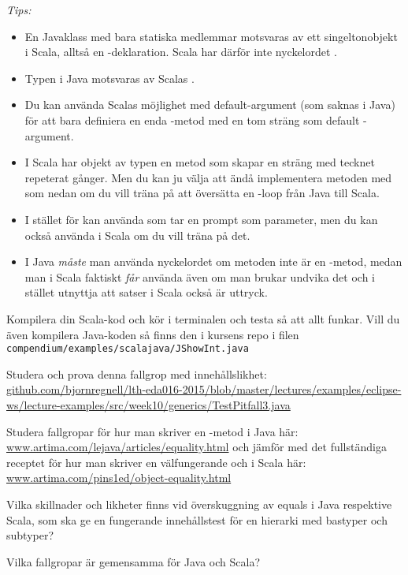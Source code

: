 
\emph{Tips:}
\begin{itemize}[nolistsep, noitemsep]
\item En Javaklass med bara statiska medlemmar motsvaras av ett singeltonobjekt i Scala, alltså en -deklaration. Scala har därför inte nyckelordet .
\item Typen  i Java motsvaras av Scalas .
\item Du kan använda Scalas möjlighet med default-argument (som saknas i Java) för att bara definiera en enda -metod med en tom sträng som default -argument.
\item I Scala har objekt av typen  en metod  som skapar en sträng med tecknet repeterat  gånger. Men du kan ju välja att ändå implementera metoden  med  som nedan om du vill träna på att översätta en -loop från Java till Scala.
\item I stället för  kan använda  som tar en prompt som parameter, men du kan också använda  i Scala om du vill träna på det.
\item I Java \emph{måste} man använda nyckelordet  om metoden inte är en -metod, medan man i Scala faktiskt \emph{får} använda  även om man brukar undvika det och i stället utnyttja att satser i Scala också är uttryck.
\end{itemize}
Kompilera din Scala-kod och kör i terminalen och testa så att allt funkar. Vill du även kompilera Java-koden så finns den i kursens repo i filen\\ \texttt{compendium/examples/scalajava/JShowInt.java}


\Task Studera och prova denna fallgrop med innehållslikhet:\\ \href{https://github.com/bjornregnell/lth-eda016-2015/blob/master/lectures/examples/eclipse-ws/lecture-examples/src/week10/generics/TestPitfall3.java}{\small github.com/bjornregnell/lth-eda016-2015/blob/master/lectures/examples/eclipse-ws/lecture-examples/src/week10/generics/TestPitfall3.java}





\AdvancedTasks %


\Task\Pen Studera fallgropar för hur man skriver en -metod i Java här:
\href{http://www.artima.com/lejava/articles/equality.html}{www.artima.com/lejava/articles/equality.html} och jämför med  det fullständiga receptet för hur man skriver en välfungerande  och  i Scala här: \href{http://www.artima.com/pins1ed/object-equality.html}{www.artima.com/pins1ed/object-equality.html}  

\Subtask Vilka skillnader och likheter finns vid överskuggning av equals i Java respektive Scala, som ska ge en fungerande innehållstest för en hierarki med bastyper och subtyper? 

\Subtask Vilka fallgropar är gemensamma för Java och Scala?

